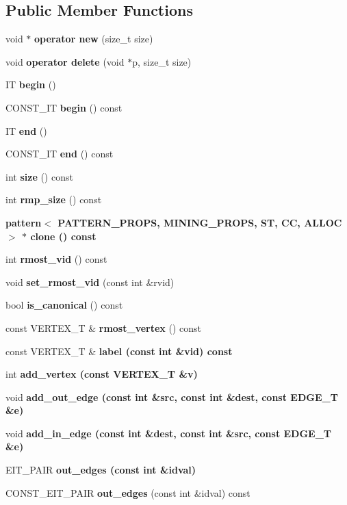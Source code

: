 \subsection*{Public Member Functions}
\begin{CompactItemize}
\item 
void $\ast$ \textbf{operator new} (size\_\-t size)\label{classpattern_2d66c14f135d20f1cf3dc1c790dfa282}

\item 
void \textbf{operator delete} (void $\ast$p, size\_\-t size)\label{classpattern_eda8f56ab66a3c76b01bf733b84374ef}

\item 
IT \textbf{begin} ()\label{classpattern_9072ce0ada8743fe93472c2ec2a02023}

\item 
CONST\_\-IT \textbf{begin} () const \label{classpattern_95b5eba42633f1a123c05ebfbc545c46}

\item 
IT \textbf{end} ()\label{classpattern_fac2e2e661509dbe137735dfa9d708cb}

\item 
CONST\_\-IT \textbf{end} () const \label{classpattern_43f9193037debbb8e4396fdd67224668}

\item 
int \textbf{size} () const \label{classpattern_a562aa4444ab51addee33f9ab09f1221}

\item 
int \textbf{rmp\_\-size} () const \label{classpattern_36fd9acf2732122907294f274be176dd}

\item 
\bf{pattern}$<$ PATTERN\_\-PROPS, MINING\_\-PROPS, ST, CC, ALLOC $>$ $\ast$ \bf{clone} () const 
\item 
int \textbf{rmost\_\-vid} () const \label{classpattern_51983ced4ce254ee0035466b5f324533}

\item 
void \textbf{set\_\-rmost\_\-vid} (const int \&rvid)\label{classpattern_0d39b60313a86cbba054f85daab60227}

\item 
bool \textbf{is\_\-canonical} () const \label{classpattern_0c48a644f5cd2310cb0cee78fb0904f5}

\item 
const VERTEX\_\-T \& \textbf{rmost\_\-vertex} () const \label{classpattern_28c5967962a46cb6c7335a962584b562}

\item 
const VERTEX\_\-T \& \bf{label} (const int \&vid) const 
\item 
int \bf{add\_\-vertex} (const VERTEX\_\-T \&v)
\item 
void \bf{add\_\-out\_\-edge} (const int \&src, const int \&dest, const EDGE\_\-T \&e)
\item 
void \bf{add\_\-in\_\-edge} (const int \&dest, const int \&src, const EDGE\_\-T \&e)
\item 
EIT\_\-PAIR \bf{out\_\-edges} (const int \&idval)
\item 
CONST\_\-EIT\_\-PAIR \textbf{out\_\-edges} (const int \&idval) const \label{classpattern_e71593727bff769def2edfca95ccc633}


\end{CompactItemize}
